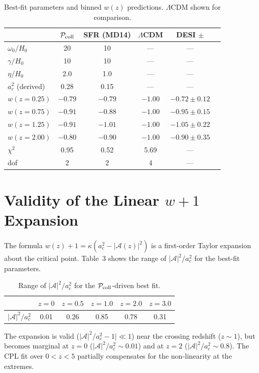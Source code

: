\documentclass[aps,prd,onecolumn]{revtex4-2}
\begin{document}
\begin{table}[h]
\centering
\caption{Best-fit parameters and binned $w(z)$ predictions. $\Lambda$CDM shown for comparison.}
\begin{tabular}{lccccc}
\toprule
 & $\mathcal{P}_{\rm coll}$ & SFR (MD14) & $\Lambda$CDM & DESI $\pm$ \\
\midrule
$\omega_0/H_0$ & 20 & 10 & --- & --- \\
$\gamma/H_0$ & 10 & 10 & --- & --- \\
$\eta/H_0$ & 2.0 & 1.0 & --- & --- \\
$a_c^2$ (derived) & 0.28 & 0.15 & --- & --- \\
\midrule
$w(z=0.25)$ & $-0.79$ & $-0.79$ & $-1.00$ & $-0.72 \pm 0.12$ \\
$w(z=0.75)$ & $-0.91$ & $-0.88$ & $-1.00$ & $-0.95 \pm 0.15$ \\
$w(z=1.25)$ & $-0.91$ & $-1.01$ & $-1.00$ & $-1.05 \pm 0.22$ \\
$w(z=2.00)$ & $-0.80$ & $-0.90$ & $-1.00$ & $-0.90 \pm 0.35$ \\
\midrule
$\chi^2$ & 0.95 & 0.52 & 5.69 & --- \\
dof & 2 & 2 & 4 & --- \\
\bottomrule
\end{tabular}
\end{table}

\section{Validity of the Linear $w+1$ Expansion}

The formula $w(z)+1 = \kappa(a_c^2 - |\mathcal{A}(z)|^2)$ is a first-order Taylor expansion about the critical point. Table~3 shows the range of $|\mathcal{A}|^2/a_c^2$ for the best-fit parameters.

\begin{table}[h]
\centering
\caption{Range of $|\mathcal{A}|^2/a_c^2$ for the $\mathcal{P}_{\rm coll}$-driven best fit.}
\begin{tabular}{lccccc}
\toprule
 & $z=0$ & $z=0.5$ & $z=1.0$ & $z=2.0$ & $z=3.0$ \\
\midrule
$|\mathcal{A}|^2/a_c^2$ & 0.01 & 0.26 & 0.85 & 0.78 & 0.31 \\
\bottomrule
\end{tabular}
\end{table}

The expansion is valid ($|\mathcal{A}|^2/a_c^2 - 1| \ll 1$) near the crossing redshift ($z \sim 1$), but becomes marginal at $z=0$ ($|\mathcal{A}|^2/a_c^2 \sim 0.01$) and at $z=2$ ($|\mathcal{A}|^2/a_c^2 \sim 0.8$). The CPL fit over $0 < z < 5$ partially compensates for the non-linearity at the extremes.
\end{document}
